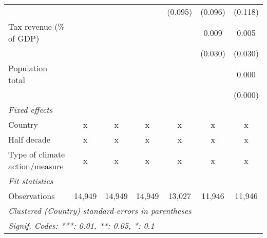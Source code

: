 \begin{tabular}{lcccccc}
                                                  &                &               &                & (0.095)       & (0.096)       & (0.118)\\   
   Tax revenue (\% of GDP)                        &                &               &                &               & 0.009         & 0.005\\   
                                                  &                &               &                &               & (0.030)       & (0.030)\\   
   Population total                               &                &               &                &               &               & 0.000\\   
                                                  &                &               &                &               &               & (0.000)\\   
   \emph{Fixed effects}\\
   Country                                        & x              & x             & x              & x             & x             & x\\  
   Half decade                                    & x              & x             & x              & x             & x             & x\\  
   Type of climate action/measure                 & x              & x             & x              & x             & x             & x\\  
   \midrule \emph{Fit statistics}\\
   Observations                                   & 14,949         & 14,949        & 14,949         & 13,027        & 11,946        & 11,946\\  
   \midrule
   \multicolumn{7}{l}{\emph{Clustered (Country) standard-errors in parentheses}}\\
   \multicolumn{7}{l}{\emph{Signif. Codes: ***: 0.01, **: 0.05, *: 0.1}}\\
\end{tabular}
\par\endgroup



